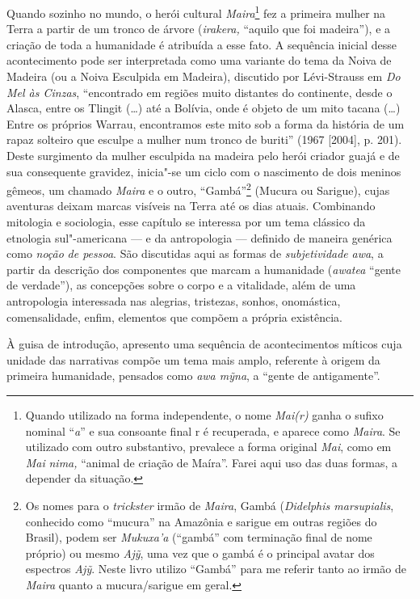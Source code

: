 Quando sozinho no mundo, o herói cultural \emph{Maira}\footnote{Quando
  utilizado na forma independente, o nome \emph{Mai(r)} ganha o sufixo
  nominal ``\emph{a}'' e sua consoante final r é recuperada, e aparece
  como \emph{Maira}. Se utilizado com outro substantivo, prevalece a
  forma original \emph{Mai}, como em \emph{Mai} \emph{nima,} ``animal de
      criação de Maíra''. Farei aqui uso das duas formas, a depender da
  situação.} fez a primeira mulher na Terra a partir de um tronco de
árvore (\emph{irakera,} ``aquilo que foi madeira''), e a criação de toda a
humanidade é atribuída a esse fato. A sequência inicial desse
acontecimento pode ser interpretada como uma variante do tema da Noiva
de Madeira (ou a Noiva Esculpida em Madeira), discutido por Lévi-Strauss
em \emph{Do Mel às Cinzas}, ``encontrado em regiões muito distantes do
continente, desde o Alasca, entre os Tlingit (\ldots{}) até a Bolívia, onde é
objeto de um mito tacana (\ldots{}) Entre os próprios Warrau, encontramos
este mito sob a forma da história de um rapaz solteiro que esculpe a
mulher num tronco de buriti'' (1967 {[}2004{]}, p. 201). Deste surgimento
da mulher esculpida na madeira pelo herói criador guajá e de sua
consequente gravidez, inicia"-se um ciclo com o nascimento de dois
meninos gêmeos, um chamado \emph{Maira} e o outro, ``Gambá''\footnote{Os
  nomes para o \emph{trickster} irmão de \emph{Maira}, Gambá
  (\emph{Didelphis marsupialis}, conhecido como ``mucura'' na Amazônia e
  sarigue em outras regiões do Brasil), podem ser \emph{Mukuxa'a}
  (``gambá'' com terminação final de nome próprio) ou mesmo \emph{Ajỹ},
  uma vez que o gambá é o principal avatar dos espectros \emph{Ajỹ}.
  Neste livro utilizo ``Gambá'' para me referir tanto ao irmão de
  \emph{Maira} quanto a mucura/sarigue em geral.} (Mucura ou Sarigue),
cujas aventuras deixam marcas visíveis na Terra até os dias atuais.
Combinando mitologia e sociologia, esse capítulo se interessa por um
tema clássico da etnologia sul"-americana --- e da antropologia --- definido
de maneira genérica como \emph{noção} \emph{de pessoa}. São discutidas
aqui as formas de \emph{subjetividade} \emph{awa}, a partir da descrição
dos componentes que marcam a humanidade (\emph{awatea} ``gente de
verdade''), as concepções sobre o corpo e a vitalidade, além de uma
antropologia interessada nas alegrias, tristezas, sonhos, onomástica,
comensalidade, enfim, elementos que compõem a própria existência.

À guisa de introdução, apresento uma sequência de acontecimentos míticos
cuja unidade das narrativas compõe um tema mais amplo, referente à
origem da primeira humanidade, pensados como \emph{awa mỹna}, a ``gente
de antigamente''.

